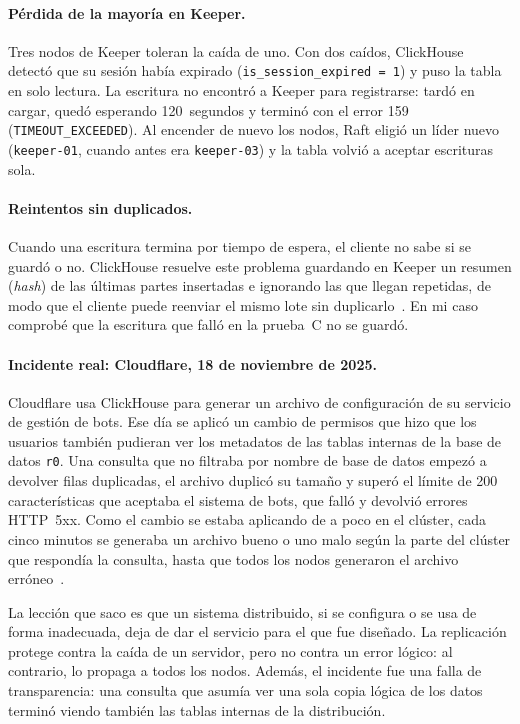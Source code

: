 \documentclass[12pt,a4paper]{article}
\begin{document}
\paragraph{Pérdida de la mayoría en Keeper.} Tres nodos de Keeper
toleran la caída de uno. Con dos caídos, ClickHouse detectó que su
sesión había expirado (\texttt{is\_session\_expired = 1}) y puso la tabla
en solo lectura. La escritura no encontró a Keeper para registrarse:
tardó en cargar, quedó esperando 120~segundos y terminó con el
error 159 (\texttt{TIMEOUT\_EXCEEDED}). Al encender de nuevo los nodos,
Raft eligió un líder nuevo (\texttt{keeper-01}, cuando antes era
\texttt{keeper-03}) y la tabla volvió a aceptar escrituras sola.

\paragraph{Reintentos sin duplicados.} Cuando una escritura termina por
tiempo de espera, el cliente no sabe si se guardó o no. ClickHouse
resuelve este problema guardando en Keeper un resumen (\emph{hash}) de
las últimas partes insertadas e ignorando las que llegan repetidas, de
modo que el cliente puede reenviar el mismo lote sin
duplicarlo~\cite[p.~3736]{schulze2024}. En mi caso comprobé que la
escritura que falló en la prueba~C no se guardó.

\paragraph{Incidente real: Cloudflare, 18 de noviembre de 2025.} Cloudflare
usa ClickHouse para generar un archivo de configuración de su servicio
de gestión de bots. Ese día se aplicó un cambio de permisos que hizo
que los usuarios también pudieran ver los metadatos de las tablas
internas de la base de datos \texttt{r0}. Una consulta que no filtraba por nombre de base de datos
empezó a devolver filas duplicadas, el archivo duplicó su tamaño y
superó el límite de 200 características que aceptaba el sistema de
bots, que falló y devolvió errores HTTP~5xx. Como el cambio se estaba
aplicando de a poco en el clúster, cada cinco minutos se generaba un
archivo bueno o uno malo según la parte del clúster que respondía la
consulta, hasta que todos los nodos generaron el archivo erróneo~\cite{cloudflare2025}.

La lección que saco es que un sistema distribuido, si se configura o se
usa de forma inadecuada, deja de dar el servicio para el que fue
diseñado. La replicación protege contra la caída de un servidor, pero no
contra un error lógico: al contrario, lo propaga a todos los nodos.
Además, el incidente fue una falla de transparencia: una consulta que
asumía ver una sola copia lógica de los datos terminó viendo también las
tablas internas de la distribución.
\end{document}
